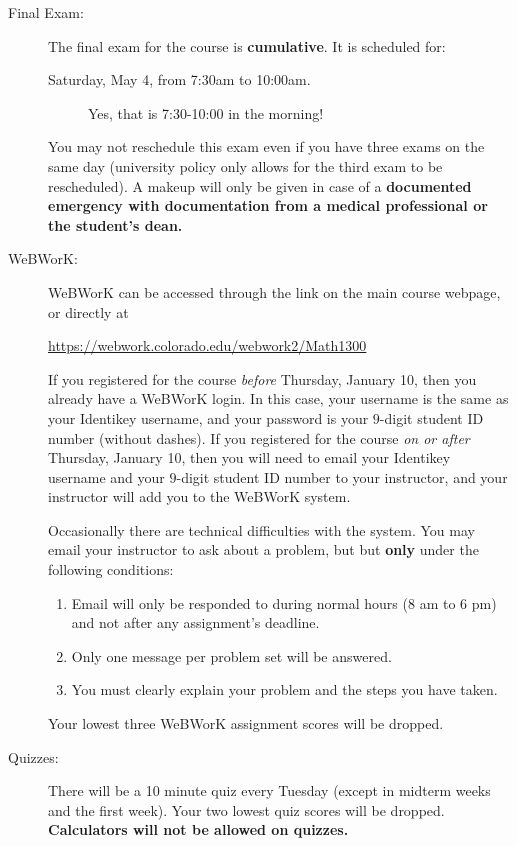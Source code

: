 \documentclass[11pt]{article}
\begin{document}
\begin{description}
\item[Final Exam:] The final exam for the course is
  \textbf{cumulative}.  It is scheduled for:

  \begin{description}
  \item[Saturday, May 4, from 7:30am to 10:00am.]
    Yes, that is 7:30-10:00 in the morning!
  \end{description}

  You may not reschedule this exam even if you have three exams on the
  same day (university policy only allows for the third exam to be
  rescheduled). A makeup will only be given in case of a
  \textbf{documented emergency with documentation from a medical
    professional or the student's dean.}

\item[WeBWorK:] WeBWorK can be accessed through the link on the main
  course webpage, or directly at

  \begin{center}
    \url{https://webwork.colorado.edu/webwork2/Math1300}
  \end{center}

  If you registered for the course \emph{before} Thursday, January 10,
  then you already have a WeBWorK login. In this case, your username
  is the same as your Identikey username, and your password is your
  $9$-digit student ID number (without dashes). If you registered for
  the course \emph{on or after} Thursday, January 10, then you will
  need to email your Identikey username and your $9$-digit student ID
  number to your instructor, and your instructor will add you to the
  WeBWorK system.

  Occasionally there are technical difficulties with the system. You
  may email your instructor to ask about a problem, but but
  \textbf{only} under the following conditions:
  \begin{enumerate}
  \item Email will only be responded to during normal hours (8 am to 6
    pm) and not after any assignment's deadline.
  \item Only one message per problem set will be answered.
  \item You must clearly explain your problem and the steps you have
    taken.
  \end{enumerate}
  Your lowest three WeBWorK assignment scores will be dropped.

\item[Quizzes:] There will be a 10 minute quiz every Tuesday (except in
  midterm weeks and the first week).  Your two lowest quiz scores will
  be dropped. \textbf{Calculators will not be allowed on quizzes.}


\end{description}
\end{document}
